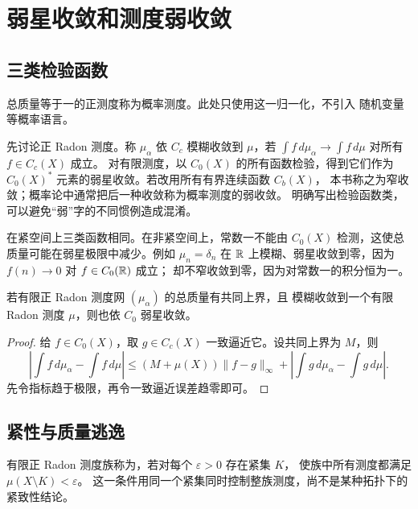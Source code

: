 \section{弱星收敛和测度弱收敛}
\label{sec:radon-measure-convergences}

\subsection{三类检验函数}

总质量等于一的正测度称为概率测度。此处只使用这一归一化，不引入
随机变量等概率语言。

先讨论正 Radon 测度。称 \(\mu_\alpha\) 依 \(C_c\) 模糊收敛到 \(\mu\)，若
\(\int f\,d\mu_\alpha\to\int f\,d\mu\) 对所有 \(f\in C_c(X)\) 成立。
对有限测度，以 \(C_0(X)\) 的所有函数检验，得到它们作为
\(C_0(X)^*\) 元素的弱星收敛。若改用所有有界连续函数 \(C_b(X)\)，
本书称之为窄收敛；概率论中通常把后一种收敛称为概率测度的弱收敛。
明确写出检验函数类，可以避免“弱”字的不同惯例造成混淆。

在紧空间上三类函数相同。在非紧空间上，常数一不能由 \(C_0(X)\)
检测，这使总质量可能在弱星极限中减少。例如 \(\mu_n=\delta_n\) 在 \(\mathbb{R}\)
上模糊、弱星收敛到零，因为 \(f(n)\to0\) 对 \(f\in C_0(\mathbb{R})\) 成立；
却不窄收敛到零，因为对常数一的积分恒为一。

\begin{proposition}\label{prop:vague-bounded-czero}
若有限正 Radon 测度网 \((\mu_\alpha)\) 的总质量有共同上界，且
模糊收敛到一个有限 Radon 测度 \(\mu\)，则也依 \(C_0\) 弱星收敛。
\end{proposition}
\begin{proof}
给 \(f\in C_0(X)\)，取 \(g\in C_c(X)\) 一致逼近它。设共同上界为 \(M\)，则
\[
 \left|\int f\,d\mu_\alpha-\int f\,d\mu\right|
 \le (M+\mu(X))\|f-g\|_\infty
       +\left|\int g\,d\mu_\alpha-\int g\,d\mu\right|.
\]
先令指标趋于极限，再令一致逼近误差趋零即可。
\end{proof}

\subsection{紧性与质量逃逸}

有限正 Radon 测度族称为，若对每个 \(\varepsilon>0\) 存在紧集 \(K\)，
使族中所有测度都满足 \(\mu(X\setminus K)<\varepsilon\)。
这一条件用同一个紧集同时控制整族测度，尚不是某种拓扑下的紧致性结论。

